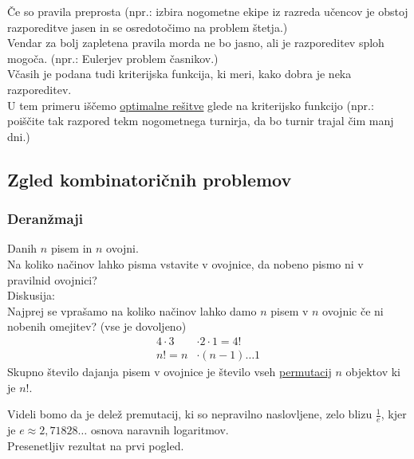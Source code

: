 \noindent
Če so pravila preprosta (npr.: izbira nogometne ekipe iz razreda učencov je obstoj razporeditve jasen in se osredotočimo na problem štetja.) \\

\noindent
Vendar za bolj zapletena pravila morda ne bo jasno, ali je razporeditev sploh mogoča. (npr.: Eulerjev problem časnikov.) \\

\noindent
Včasih je podana tudi kriterijska funkcija, ki meri, kako dobra je neka razporeditev. \\
U tem primeru iščemo \underline{optimalne rešitve} glede na kriterijsko funkcijo (npr.: poiščite tak razpored tekm nogometnega turnirja, da bo turnir trajal čim manj dni.)

\subsection{Zgled kombinatoričnih problemov}
\subsubsection{Deranžmaji}
\begin{center}
\end{center}
Danih $n$ pisem in $n$ ovojni. \\
Na koliko načinov lahko pisma vstavite v ovojnice, da nobeno pismo ni v pravilnid ovojnici? \\

\noindent
Diskusija: \\
Najprej se vprašamo na koliko načinov lahko damo $n$ pisem v $n$ ovojnic če ni nobenih omejitev? (vse je dovoljeno)
\begin{align*}
    4 \cdot 3 &\cdot 2 \cdot 1 = 4! \\
    n! = n &\cdot (n - 1) \dots 1
\end{align*}
Skupno število dajanja pisem v ovojnice je število vseh \underline{permutacij} $n$ objektov ki je $n!$.
\begin{center}
\end{center}
Videli bomo da je delež premutacij, ki so nepravilno naslovljene, zelo blizu $\frac{1}{e}$, kjer je $e \approx 2,71828\dots$ osnova naravnih logaritmov. \\

\noindent
Presenetljiv rezultat na prvi pogled. \\

